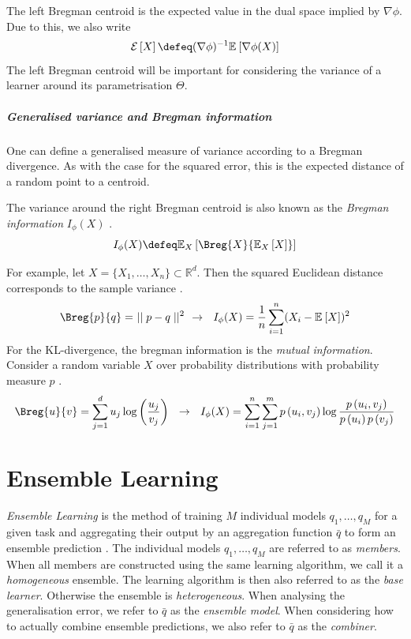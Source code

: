 \documentclass[
    a4paper, %
	fontsize=10pt, %
	twoside=false, %
]{kaobook}
\begin{document}
The left Bregman centroid is the expected value in the dual space implied by $\nabla\phi$. Due to this, we also write 
$$\mathcal{E}\left[X\right] \defeq (\nabla \phi)^{-1}\mathbb{E}_{}\left[ \nabla \phi(X) \right]$$ 
The left Bregman centroid will be important for considering the variance of a learner around its parametrisation $\Theta$.

\paragraph{Generalised variance and Bregman information}

One can define a generalised measure of variance according to a Bregman divergence. As with the case for the squared error, this is the expected distance of a random point to a centroid. 

\begin{definition}
	\label{def:bregman-information}
	The variance around the right Bregman centroid is also known as the 
	\textit{Bregman information} 
  $I_{\phi}(X)$
  \cite{banerjee_ClusteringBregmanDivergences_2004}.
$$
I_{\phi}(X) \defeq \mathbb{E}_{X}\left[ \Breg{X}{\mathbb{E}_X\left[ X \right] } \right] 
$$
\end{definition}

For example, let $X = \{ X_{1}, \dots, X_{n} \} \subset \mathbb{R}^d$. Then the squared Euclidean distance corresponds to the sample variance \cite{banerjee_ClusteringBregmanDivergences_2004}.
$$
\Breg{p}{q} =~\mid\mid p-q\mid\mid^2 ~ ~ \rightarrow ~ ~ 
I_{\phi}(X) = \frac{1}{n} \sum_{i=1}^n (X_{i} - \mathbb{E}_{}\left[ X \right] )^2
$$
For the KL-divergence, the bregman information is the \textit{mutual information}. Consider a random variable $X$ over probability distributions with probability measure $p$ \cite{banerjee_ClusteringBregmanDivergences_2004}.
$$
\Breg{u}{v} = \sum_{j=1}^d u_{j} \log \left( \frac{u_{j}}{v_{j}} \right) 
~ ~ \rightarrow ~ ~  I_{\phi}(X) = 
\sum_{i=1}^n \sum_{j=1}^m p\left(u_i, v_j\right) \log \frac{p\left(u_i, v_j\right)}{p\left(u_i\right) p\left(v_j\right)}
$$




\chapter{Ensemble Learning}
\label{chapter:ensemble-learning}

\textit{Ensemble Learning} is the method of training $M$ individual models $q_{1}, \dots, q_{M}$ for a given task and aggregating their output by an aggregation function $\bar{q}$ to form an ensemble prediction \cite{zhou_EnsembleMethodsFoundations_2012}. The individual models $q_{1}, \dots, q_{M}$ are referred to as \textit{members}. When all members are constructed using the same learning algorithm, we call it a \textit{homogeneous} ensemble. The learning algorithm is then also referred to as the \textit{base learner}. Otherwise the ensemble is \textit{heterogeneous}. 
When analysing the generalisation error, we refer to $\bar{q}$ as the \textit{ensemble model}. When considering how to actually combine ensemble predictions, we also refer to $\bar{q}$ as the \textit{combiner}. 
\end{document}

